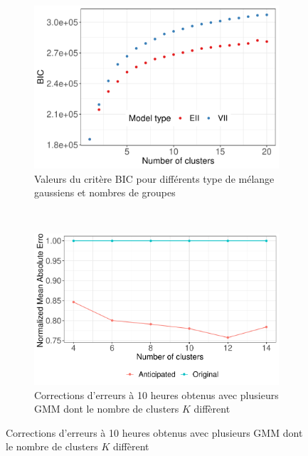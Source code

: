 \documentclass[12pt]{report}
\begin{document}
\begin{figure}[h]
	\begin{subfigure}{0.5\linewidth}
		\centering
		\includegraphics[width = 0.9 \linewidth]{Images/PV/GMM/GMM_BICCompare_20.pdf}
		\caption{Valeurs du critère BIC pour différents type de mélange gaussiens et nombres de groupes}
		\label{fig:PV_GMM_BIC}
	\end{subfigure}
	~
	\begin{subfigure}{0.5\linewidth}
		\centering
		\includegraphics[width = 0.9 \linewidth]{Images/PV/GMM/GMM_CompareIntraday.pdf}
		\caption{Corrections d'erreurs à 10 heures obtenus avec plusieurs GMM dont le nombre de clusters $K$ diffèrent}
		\label{fig:PV_GMM_IntradayComp}
	\end{subfigure}
\end{figure}
\end{document}
